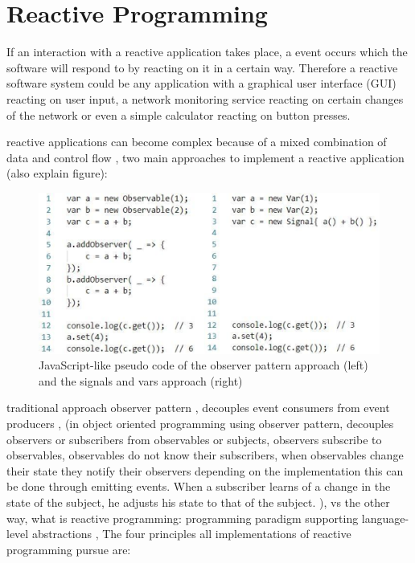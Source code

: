 \documentclass[Bachelor,BIF,english]{twbook}
\begin{document}
\section{Reactive Programming}
If an interaction with a reactive application takes place, a event occurs which the software will respond to by reacting on it in a certain way. Therefore a reactive software system could be any application with a graphical user interface (GUI) reacting on user input, a network monitoring service reacting on certain changes of the network or even a simple calculator reacting on button presses. 

reactive applications can become complex because of a mixed combination of data and control flow \cite[p.~1]{PositivEffectOfRP}, 
two main approaches to implement a reactive application (also explain figure):
\begin{figure}[!htbp]
\centering
\includegraphics[width=0.75\linewidth]{PICs/pseudo_Code_reactive_2_ways.eps}
\caption{JavaScript-like pseudo code of the observer pattern approach (left) and the signals and vars approach (right) \cite[p.~797]{DebuggingRP} \cite[p.~3]{PositivEffectOfRP}}\label{Fig1}
\end{figure}
traditional approach observer pattern \cite[p.~360-372]{ObserverDP}, decouples event consumers from event producers \cite[p.~953]{RPWalkthrough}, (in object oriented programming using observer pattern, decouples observers or subscribers from observables or subjects, observers subscribe to observables, observables do not know their subscribers, when observables change their state they notify their observers depending on the implementation this can be done through emitting events. When a subscriber learns of a change in the state of the subject, he adjusts his state to that of the subject. \cite[p.~363]{ObserverDP}),
vs the other way, what is reactive programming: programming paradigm supporting language-level abstractions \cite[p.~953]{RPWalkthrough}, The four principles all implementations of reactive programming pursue are:
\end{document}
